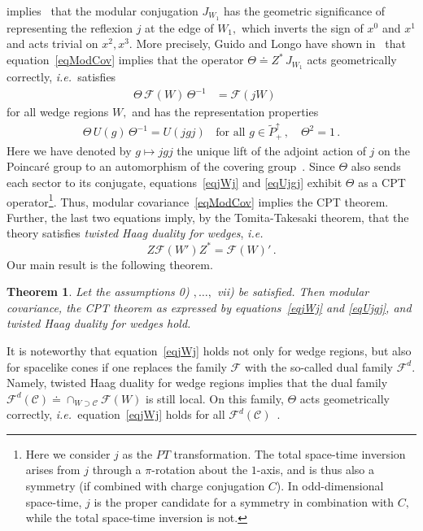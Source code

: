 \documentclass[a4paper,reqno,11pt]{amsart}
\theoremstyle{plain}
\newtheorem{Thm}{Theorem}%
\theoremstyle{definition}
\numberwithin{equation}{section}
\newcommand{\F}{{\mathcal F}}
\newcommand{\calC}{{\mathcal C}}
\newcommand{\Potild}{\tilde{P}_+^{\uparrow}}
\newcommand{\unity}{1}
\newcommand{\JWR}{J_{W_1}}  %
\newcommand{\CPTop}{\Theta} %
\newcommand{\cone}{\calC}   %
\begin{document}
implies~\cite{GL} that the modular conjugation $\JWR$ 
has the geometric significance of representing the reflexion $j$ at
the edge of $W_1,$ which inverts the sign of $x^0$ and $x^1$ and acts
trivial on $x^2,x^3.$ More precisely, Guido and Longo have shown
in~\cite{GL} that equation~\eqref{eqModCov} implies that the operator 
$\CPTop\doteq Z^*\,\JWR$  acts geometrically correctly, {\it i.e.\ }satisfies 
\begin{align}
    \CPTop\,\F(W)\,\CPTop^{-1}&=\F(j W)\,\quad \label{eqjWj} 
\end{align} 
for all wedge regions $W,$ and has the representation properties  
\begin{align} \label{eqUjgj}
\CPTop\,U(g)\,\CPTop^{-1}=U(jgj) \;\;   \mbox{ for
      all } g\in\Potild\,, \quad \CPTop^2=\unity\,.  
\end{align} 
Here we have denoted by $g\mapsto jgj$ the unique lift of the adjoint
action of $j$ on the Poincar\'e group to an automorphism of the 
covering group~\cite{Var2}. Since $\CPTop$ also sends each sector to its 
conjugate, equations~\eqref{eqjWj} and \eqref{eqUjgj}
exhibit $\CPTop$ as a CPT operator\footnote{Here we consider $j$ as the $PT$ 
transformation. The total space-time inversion arises from
$j$ through a $\pi$-rotation about the $1$-axis, and is thus also a 
symmetry (if combined with charge conjugation $C$). In odd-dimensional 
space-time, $j$ is the proper candidate for a 
symmetry in combination with $C,$ while the total space-time 
inversion is not. }. 
Thus, modular covariance~\eqref{eqModCov} implies the CPT
theorem. Further, the last two equations imply, by the Tomita-Takesaki 
theorem, that the theory satisfies {\em twisted Haag duality for wedges}, 
{\em i.e.\ } 
\begin{equation} \label{eqTHD}
 Z\F(W')Z^* = \F(W)'\,.
\end{equation}
Our main result is the following theorem. 
\begin{Thm} \label{BiWi} 
Let the assumptions 0) $,\ldots,$ vii) be satisfied. Then modular 
covariance, 
the CPT theorem as expressed by equations~\eqref{eqjWj} and
\eqref{eqUjgj}, and twisted Haag duality for wedges  hold. 
\end{Thm}
It is noteworthy that equation~\eqref{eqjWj} holds not only for wedge
regions, but also for spacelike cones if one replaces the family $\F$ with the
so-called dual family $\F^d.$ Namely, twisted Haag duality for wedge
regions implies that the dual family $\F^d(\cone)\doteq\cap_{W\supset
  \cone}\F(W)$ is still local. On this family, $\CPTop$ acts 
geometrically correctly, {\it i.e.\ }equation~\eqref{eqjWj} holds 
for all $\F^d(\cone)$~\cite{GL}.  
\end{document}
